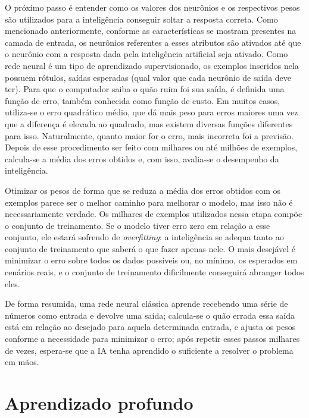 O próximo passo é entender como os valores dos neurônios e os respectivos pesos são utilizados para a inteligência conseguir soltar a resposta correta.
Como mencionado anteriormente, conforme as características se mostram presentes na camada de entrada, os neurônios referentes a esses atributos são ativados até que o neurônio com a resposta dada pela inteligência artificial seja ativado.
Como rede neural é um tipo de aprendizado supervisionado, os exemplos inseridos nela possuem rótulos, saídas esperadas (qual valor que cada neurônio de saída deve ter).
Para que o computador saiba o quão ruim foi sua saída, é definida uma função de erro, também conhecida como função de custo.
Em muitos casos, utiliza-se o erro quadrático médio, que dá mais peso para erros maiores uma vez que a diferença é elevada ao quadrado, mas existem diversas funções diferentes para isso.
Naturalmente, quanto maior for o erro, mais incorreta foi a previsão.
Depois de esse procedimento ser feito com milhares ou até milhões de exemplos, calcula-se a média dos erros obtidos e, com isso, avalia-se o desempenho da inteligência.

Otimizar os pesos de forma que se reduza a média dos erros obtidos com os exemplos parece ser o melhor caminho para melhorar o modelo, mas isso não é necessariamente verdade.
Os milhares de exemplos utilizados nessa etapa compõe o conjunto de treinamento.
Se o modelo tiver erro zero em relação a esse conjunto, ele estará sofrendo de \textit{overfitting}: a inteligência se adequa tanto ao conjunto de treinamento que saberá o que fazer apenas nele.
O mais desejável é minimizar o erro sobre todos os dados possíveis ou, no mínimo, os esperados em cenários reais, e o conjunto de treinamento dificilmente conseguirá abranger todos eles.

De forma resumida, uma rede neural clássica aprende recebendo uma série de números como entrada e devolve uma saída;
calcula-se o quão errada essa saída está em relação ao desejado para aquela determinada entrada, e ajusta os pesos conforme a necessidade para minimizar o erro;
após repetir esses passos milhares de vezes, espera-se que a IA tenha aprendido o suficiente a resolver o problema em mãos.


\section{Aprendizado profundo}
\label{sec:dl}

